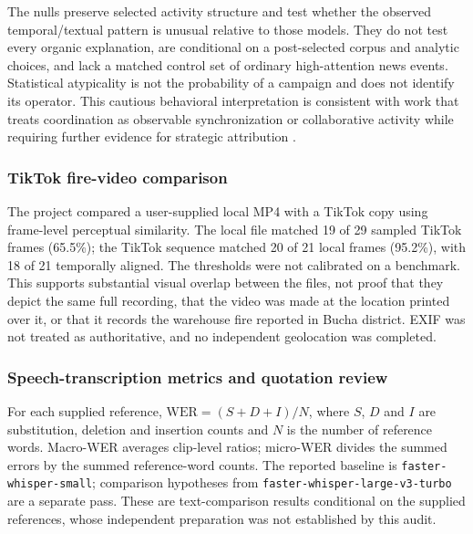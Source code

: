 The nulls preserve selected activity structure and test whether the observed temporal/textual pattern is unusual relative to those models. They do not test every organic explanation, are conditional on a post-selected corpus and analytic choices, and lack a matched control set of ordinary high-attention news events. Statistical atypicality is not the probability of a campaign and does not identify its operator. This cautious behavioral interpretation is consistent with work that treats coordination as observable synchronization or collaborative activity while requiring further evidence for strategic attribution \citep{starbird2019collaborative,pacheco2021uncovering,nizzoli2021coordinated,magelinski2022synchronized,ng2023combined}.

\subsubsection{TikTok fire-video comparison}

The project compared a user-supplied local MP4 with a TikTok copy using frame-level perceptual similarity. The local file matched 19 of 29 sampled TikTok frames (65.5\%); the TikTok sequence matched 20 of 21 local frames (95.2\%), with 18 of 21 temporally aligned. The thresholds were not calibrated on a benchmark. This supports substantial visual overlap between the files, not proof that they depict the same full recording, that the video was made at the location printed over it, or that it records the warehouse fire reported in Bucha district. EXIF was not treated as authoritative, and no independent geolocation was completed.

\subsubsection{Speech-transcription metrics and quotation review}

For each supplied reference, $\mathrm{WER}=(S+D+I)/N$, where $S$, $D$ and $I$ are substitution, deletion and insertion counts and $N$ is the number of reference words. Macro-WER averages clip-level ratios; micro-WER divides the summed errors by the summed reference-word counts. The reported baseline is \texttt{faster-whisper-small}; comparison hypotheses from \texttt{faster-whisper-large-v3-turbo} are a separate pass. These are text-comparison results conditional on the supplied references, whose independent preparation was not established by this audit.

